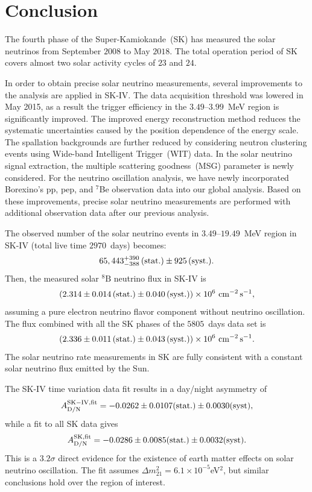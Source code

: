 \documentclass[aps,prd,reprint,superscriptaddress,floatfix,altaffilletter,nofootinbib]{revtex4-2}
\begin{document}
\section{Conclusion}

The fourth phase of the Super-Kamiokande~(SK) has measured 
the solar neutrinos from September $2008$ to May $2018$. 
The total operation period of SK covers almost two solar activity cycles of $23$ and $24$.

In order to obtain precise solar neutrino measurements, several improvements to the analysis are applied in SK-IV.
The data acquisition threshold was lowered in May 2015, as a result the trigger efficiency 
in the $3.49$--$3.99$~MeV region is 
significantly improved.
The improved energy reconstruction method reduces the systematic uncertainties caused by the position dependence of the energy scale.
The spallation backgrounds are further reduced by considering neutron clustering events using Wide-band Intelligent Trigger~(WIT) data.
In the solar neutrino signal extraction, the multiple scattering goodness~(MSG) parameter is newly considered.
For the neutrino oscillation analysis, we have newly incorporated Borexino's pp, pep, and $^7$Be observation data into our global analysis.
Based on these improvements, precise solar neutrino measurements are performed with additional observation data after our previous analysis. 


The observed number of the solar neutrino events in $3.49$--$19.49$~MeV region in SK-IV (total live time $2970$~days) becomes:
\begin{eqnarray}
  65,443^{+390}_{-388}\,(\mathrm{stat.})\pm925\,(\mathrm{syst.}). \notag
\end{eqnarray}
Then, the measured solar $\mathrm{^{8}B}$ neutrino flux in SK-IV is
\begin{eqnarray}
  (2.314 \pm 0.014\, \rm{(stat.)} \pm 0.040 \, \rm{(syst.)}) \times 10^{6}~\mathrm{cm^{-2}\,s^{-1}}, \notag
\end{eqnarray}
assuming a pure electron neutrino flavor component without neutrino oscillation.
The flux combined with all the SK phases of the $5805$~days data set is
\begin{eqnarray}
  (2.336 \pm 0.011\, \rm{(stat.)} \pm 0.043 \, \rm{(syst.)}) \times 10^{6}~\mathrm{cm^{-2}\,s^{-1}}. \notag
\end{eqnarray}
The solar neutrino rate measurements in SK are fully consistent with a constant solar neutrino flux emitted by the Sun.

The SK-IV time variation data fit results in a day/night asymmetry of
\[
A^{\rm{SK-IV, fit}}_{\rm{D/N}}=-0.0262\pm0.0107\rm{(stat.)}\pm0.0030\rm{(syst)},
\]
while a fit to all SK data gives
\[
A^{\rm{SK, fit}}_{\rm{D/N}}=-0.0286\pm0.0085\rm{(stat.)}\pm0.0032\rm{(syst)}.
\]
This is a $3.2\sigma$ direct evidence for the existence of earth matter effects on solar neutrino oscillation. The fit assumes $\Delta m^2_{21}=6.1\times10^{-5}$eV$^2$, but similar conclusions hold over the region of interest.
\end{document}
